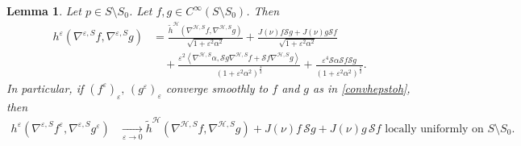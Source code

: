 \documentclass[11pt]{amsart}
\newcommand{\hhh}{{\mathcal{H}}}
\newcommand{\vh}{\nu}
\newcommand{\eps}{\varepsilon}
\newcommand{\s}{\mathcal S}
\newtheorem{lemma}[theorem]{Lemma}
\theoremstyle{definition}
\theoremstyle{remark}
\numberwithin{equation}{section}
\begin{document}
\begin{lemma}\label{lemmasecofondformcondueparametri}
    Let $p\in S\setminus S_0$. Let $f,g\in C^\infty(S\setminus S_0)$. Then 
    \begin{equation}\label{hepsgradepsprimadilimieteffbgyhygtfr}
        \begin{split}
            h^\eps\left(\nabla^{\eps,S}f,\nabla^{\eps,S}g\right)&=\frac{\tilde h^\hhh\left(\nabla^{\hhh,S}f,\nabla^{\hhh,S}g\right)}{\sqrt{1+\eps^2\alpha^2}}+\frac{J(\vh) f\s g+J(\vh)g\s f}{\sqrt{1+\eps^2\alpha^2}}\\
            &\quad+\frac{\eps^2\left\langle \nabla^{\hhh,S}\alpha,\s g\nabla^{\hhh,S}f+\s f\nabla^{\hhh,S}g\right\rangle}{\left(1+\eps^2\alpha^2\right)^\frac{3}{2}}+\frac{\eps^4\s\alpha\s f\s g}{\left(1+\eps^2\alpha^2\right)^\frac{5}{2}}.
        \end{split}
    \end{equation}
    In particular, if $(f^\eps)_\eps,\,(g^\eps)_\eps$ converge smoothly to $f$ and $g$ as in \eqref{convhepstoh}, then    \begin{equation}\label{convhepsgradeps}
        \begin{split}
        h^\eps\left(\nabla^{\eps,S}f^\eps,\nabla^{\eps,S}g^\eps\right)&\xrightarrow[\eps\to 0]{}\tilde h^\hhh\left(\nabla^{\hhh,S}f,\nabla^{\hhh,S}g\right)+ J(\vh)f\,\s g+J(\vh)g\,\s f \text{ locally uniformly on $S\setminus S_0$.}
        \end{split}
    \end{equation}
    
\end{lemma}
\end{document}
